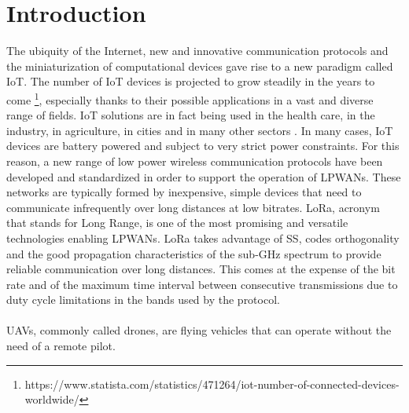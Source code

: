 
\chapter{Introduction}
\label{chapter:introduction}


The ubiquity of the Internet, new and innovative communication protocols and the miniaturization of computational devices gave rise to a new paradigm called \gls{IoT}. The number of \gls{IoT} devices is projected to grow steadily in the years to come \footnote{https://www.statista.com/statistics/471264/iot-number-of-connected-devices-worldwide/}, especially thanks to their possible applications in a vast and diverse range of fields. \gls{IoT} solutions are in fact being used in the health care, in the industry, in agriculture, in cities and in many other sectors \cite{ref:iot-apps}. In many cases, \gls{IoT} devices are battery powered and subject to very strict power constraints. For this reason, a new range of low power wireless communication protocols have been developed and standardized in order to support the operation of \glspl{LPWAN}. These networks are typically formed by inexpensive, simple devices that need to communicate infrequently over long distances at low bitrates. LoRa, acronym that stands for Long Range, is one of the most promising and versatile technologies enabling \glspl{LPWAN}. LoRa takes advantage of \gls{SS}, codes orthogonality and the good propagation characteristics of the sub-GHz spectrum to provide reliable communication over long distances. This comes at the expense of the bit rate and of the maximum time interval between consecutive transmissions due to duty cycle limitations in the bands used by the protocol. \\\\
\glspl{UAV}, commonly called drones, are flying vehicles that can operate without the need of a remote pilot.
